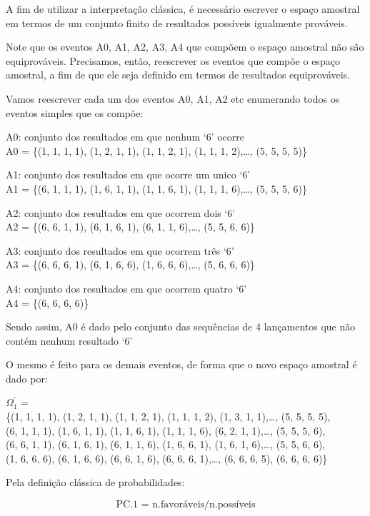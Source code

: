 \documentclass[
]{book}
\theoremstyle{definition}
\theoremstyle{definition}
\theoremstyle{definition}
\theoremstyle{remark}
\begin{document}
A fim de utilizar a interpretação clássica, é necessário escrever o espaço amostral em termos de um conjunto finito de resultados possíveis igualmente prováveis.

Note que os eventos A0, A1, A2, A3, A4 que compõem o espaço amostral não
são equiprováveis. Precisamos, então, reescrever os eventos que compõe o espaço amostral, a fim de que ele seja definido em termos de resultados equiprováveis.

Vamos reescrever cada um dos eventos A0, A1, A2 etc enumerando todos os eventos simples que os compõe:

A0: conjunto dos resultados em que nenhum `6' ocorre\\
A0 = \{(1, 1, 1, 1), (1, 2, 1, 1), (1, 1, 2, 1), (1, 1, 1, 2),\ldots, (5, 5, 5, 5)\}

A1: conjunto dos resultados em que ocorre um unico `6'\\
A1 = \{(6, 1, 1, 1), (1, 6, 1, 1), (1, 1, 6, 1), (1, 1, 1, 6),\ldots, (5, 5, 5, 6)\}

A2: conjunto dos resultados em que ocorrem dois `6'\\
A2 = \{(6, 6, 1, 1), (6, 1, 6, 1), (6, 1, 1, 6),\ldots, (5, 5, 6, 6)\}

A3: conjunto dos resultados em que ocorrem três `6'\\
A3 = \{(6, 6, 6, 1), (6, 1, 6, 6), (1, 6, 6, 6),\ldots, (5, 6, 6, 6)\}

A4: conjunto dos resultados em que ocorrem quatro `6'\\
A4 = \{(6, 6, 6, 6)\}

Sendo assim,
A0 é dado pelo conjunto das sequências de 4 lançamentos que não contém nenhum resultado `6'

O mesmo é feito para os demais eventos, de forma que o novo espaço amostral é dado por:

\(\Omega_1^\prime\) =\\
\{(1, 1, 1, 1), (1, 2, 1, 1), (1, 1, 2, 1), (1, 1, 1, 2), (1, 3, 1, 1),\ldots, (5, 5, 5, 5),\\
(6, 1, 1, 1), (1, 6, 1, 1), (1, 1, 6, 1), (1, 1, 1, 6), (6, 2, 1, 1),\ldots, (5, 5, 5, 6),\\
(6, 6, 1, 1), (6, 1, 6, 1), (6, 1, 1, 6), (1, 6, 6, 1), (1, 6, 1, 6),\ldots, (5, 5, 6, 6),\\
(1, 6, 6, 6), (6, 1, 6, 6), (6, 6, 1, 6), (6, 6, 6, 1),\ldots, (6, 6, 6, 5), (6, 6, 6, 6)\}

Pela definição clássica de probabilidades:

\[\text{PC.1 = n.favoráveis/n.possíveis}\]
\end{document}
